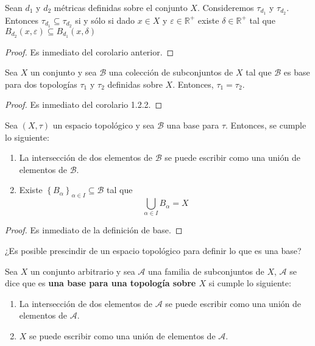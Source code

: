 \documentclass[12pt]{report}
\theoremstyle{largebreak}
\begin{document}
    \begin{cor}
        Sean $d_1$ y $d_2$ métricas definidas sobre el conjunto $X$. Consideremos $\tau_{d_1}$ y $\tau_{d_2}$. Entonces $\tau_{d_1}\subseteq \tau_{d_2}$ si y sólo si dado $x\in X$ y $\varepsilon\in\mathbb{R}^{+}$ existe $\delta\in\mathbb{R}^{+}$ tal que $B_{d_2}(x,\varepsilon)\subseteq B_{d_1}(x,\delta)$
    \end{cor}

    \begin{proof}
        Es inmediato del corolario anterior.
    \end{proof}

    \begin{cor}
        Sea $X$ un conjunto y sea $\mathcal{B}$ una colección de subconjuntos de $X$ tal que $\mathcal{B}$ es base para dos topologías $\tau_1$ y $\tau_2$ definidas sobre $X$. Entonces, $\tau_1=\tau_2$.
    \end{cor}

    \begin{proof}
        Es inmediato del corolario 1.2.2.
    \end{proof}

    \begin{cor}
        Sea $(X,\tau)$ un espacio topológico y sea $\mathcal{B}$ una base para $\tau$. Entonces, se cumple lo siguiente:
        \begin{enumerate}
            \item La intersección de dos elementos de $\mathcal{B}$ se puede escribir como una unión de elementos de $\mathcal{B}$.
            \item Existe $\left\{B_\alpha \right\}_{\alpha\in I}\subseteq\mathcal{B}$ tal que
            \begin{equation*}
                \bigcup_{\alpha\in I}B_\alpha=X
            \end{equation*}
        \end{enumerate} 
    \end{cor}

    \begin{proof}
        Es inmediato de la definición de base.
    \end{proof}

    ¿Es posible prescindir de un espacio topológico para definir lo que es una base?

    \begin{mydef}
        Sea $X$ un conjunto arbitrario y sea $\mathcal{A}$ una familia de subconjuntos de $X$, $\mathcal{A}$ se dice que es \textbf{una base para una topología sobre $X$} si cumple lo siguiente:
        \begin{enumerate}
            \item La intersección de dos elementos de $\mathcal{A}$ se puede escribir como una unión de elementos de $\mathcal{A}$.
            \item $X$ se puede escribir como una unión de elementos de $\mathcal{A}$.
        \end{enumerate}
    \end{mydef}
\end{document}
